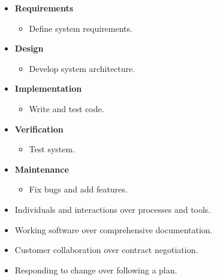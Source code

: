 \documentclass[10pt]{article}
\begin{document}
\begin{multicols}{5}
  \begin{block}
    \begin{itemize}
      \item \textbf{Requirements}
      \begin{itemize}
        \item Define system requirements.
      \end{itemize}
      \item \textbf{Design}
      \begin{itemize}
        \item Develop system architecture.
      \end{itemize}
      \item \textbf{Implementation}
      \begin{itemize}
        \item Write and test code.
      \end{itemize}
      \item \textbf{Verification}
      \begin{itemize}
        \item Test system.
      \end{itemize}
      \item \textbf{Maintenance}
      \begin{itemize}
        \item Fix bugs and add features.
      \end{itemize}
    \end{itemize}
  \end{block}

\begin{block}
    \begin{itemize}
        \item Individuals and interactions over processes and tools.
        \item Working software over comprehensive documentation.
        \item Customer collaboration over contract negotiation.
        \item Responding to change over following a plan.
    \end{itemize}
\end{block}


\end{multicols}
\end{document}
